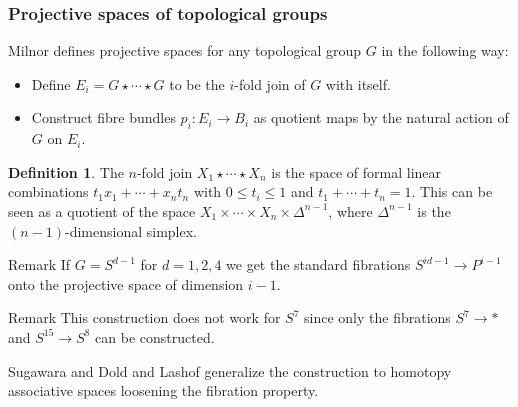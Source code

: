 \documentclass{beamer}
\theoremstyle{definition}
\newtheorem{defi}{Definition}
\begin{document}
\begin{frame}
\frametitle{Projective spaces of topological groups}
Milnor defines projective spaces for any topological group $G$ in the following way:\pause
\begin{itemize}
\item<2-> Define $E_i=G\star\cdots\star G$ to be the $i$-fold join of $G$ with itself. 
\item<2-> Construct fibre bundles $p_i:E_i\to B_i$ as quotient maps by the natural action of $G$ on $E_i$.
\end{itemize}\pause
\begin{defi}
The $n$-fold join $X_1\star\cdots\star X_n$ is the space of formal linear combinations $t_1x_1+\cdots+x_nt_n$ with $0\leq t_i\leq 1$ and $t_1+\cdots+t_n=1$. This can be seen as a quotient of the space $X_1\times\cdots\times X_n\times\Delta^{n-1}$, where $\Delta^{n-1}$ is the $(n-1)$-dimensional simplex.
\end{defi}

\end{frame}

\begin{frame}
\begin{block}{Remark}
If $G=S^{d-1}$ for $d=1,2,4$ we get the standard fibrations $S^{id-1}\to P^{i-1}$ onto the projective space of dimension $i-1$.
\end{block}\pause
\begin{block}{Remark}
This construction does not work for $S^7$ since only the fibrations $S^7\to *$ and $S^{15}\to S^8$ can be constructed.
\end{block}\pause


Sugawara and Dold and Lashof generalize the construction to homotopy associative spaces loosening the fibration property.
\end{frame}
\end{document}
